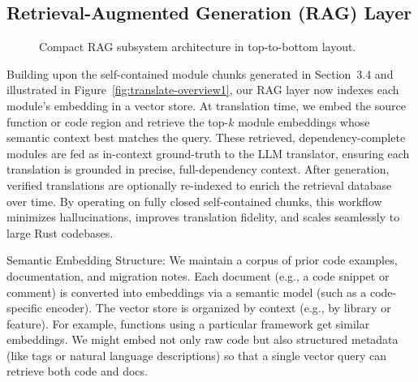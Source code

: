 \documentclass[twocolumn]{article}
\begin{document}
\subsection{Retrieval-Augmented Generation (RAG) Layer}
\begin{figure}[htbp]
    \centering
    \caption{{Compact RAG subsystem architecture in top-to-bottom layout.}}
    \label{fig:rag_compact}
    \end{figure}
    
    

    Building upon the self-contained module chunks generated in Section~3.4 and illustrated in Figure~\ref{fig:translate-overview1}, our RAG layer now indexes each module’s embedding in a vector store. At translation time, we embed the source function or code region and retrieve the top-$k$ module embeddings whose semantic context best matches the query. These retrieved, dependency-complete modules are fed as in-context ground-truth to the LLM translator, ensuring each translation is grounded in precise, full-dependency context. After generation, verified translations are optionally re-indexed to enrich the retrieval database over time. By operating on fully closed self-contained chunks, this workflow minimizes hallucinations, improves translation fidelity, and scales seamlessly to large Rust codebases.


    {Semantic Embedding Structure}: We maintain a corpus of prior code examples, documentation, and migration notes. Each document (e.g., a code snippet or comment) is converted into embeddings via a semantic model (such as a code-specific encoder). The vector store is organized by context (e.g., by library or feature). For example, functions using a particular framework get similar embeddings. We might embed not only raw code but also structured metadata (like tags or natural language descriptions) so that a single vector query can retrieve both code and docs.
\end{document}
